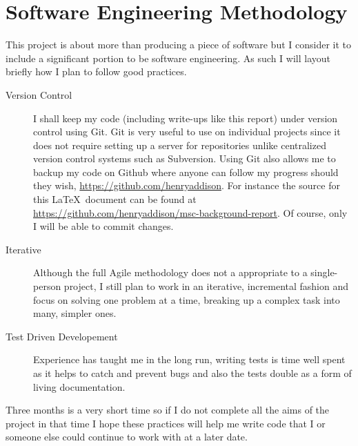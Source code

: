\appendix
\chapter{Software Engineering Methodology} \label{app:sem}
This project is about more than producing a piece of software but I
consider it to include a significant portion to be software
engineering.  As such I will layout briefly how I plan to follow good
practices. 

\begin{description}
  \item[Version Control] I shall keep my
code (including write-ups like this report) under version control
using Git. Git is very useful to use on individual projects since it
does not require setting up a server for repositories unlike centralized
version control systems such as Subversion. Using Git also allows me
to backup my code on Github where anyone can follow my progress
should they wish, \url{https://github.com/henryaddison}. 
For instance the source for this \LaTeX\ document can be found at
\url{https://github.com/henryaddison/msc-background-report}. Of
course, only I will be able to commit changes.

  \item[Iterative] Although the full Agile methodology does not a appropriate to a single-person
project, I still plan to work in an iterative, incremental fashion and
focus on solving one problem at a time, breaking up a complex
task into many, simpler ones. 

  \item[Test Driven Developement] Experience has taught me in the long run, writing
tests is time well spent as it helps to catch and prevent bugs and
also the tests double as a form of living documentation. 

\end{description}

Three months is a very short time so if I do not complete all the aims of the project in
that time I hope these practices will help me write code that I or someone else
could continue to work with at a later date.

